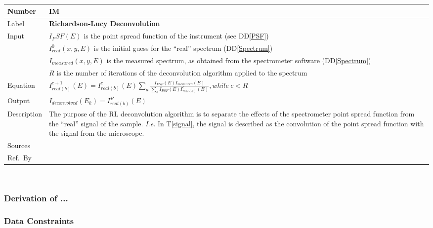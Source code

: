 \documentclass[12pt]{article}
\newcommand{\colAwidth}{0.13\textwidth}
\newcommand{\colBwidth}{0.82\textwidth}
\newcommand{\ddref}[1]{DD\ref{#1}}
\newcommand{\tref}[1]{T\ref{#1}}
\newcounter{instnum} %
\begin{document}
\noindent
\begin{minipage}{\textwidth}
	\renewcommand*{\arraystretch}{1.5}
	\begin{tabular}{| p{\colAwidth} | p{\colBwidth}|}
		\hline
		\rowcolor[gray]{0.9}
		Number& IM{instnum}\theinstnum \label{deconvolution}\\
		\hline
		Label& \bf Richardson-Lucy Deconvolution\\
		\hline
		Input& $I_PSF(E)$ is the point spread function of the instrument (see \ddref{PSF})\\
		& $I_{real}^0(x,y,E)$ is the initial guess for the ``real'' spectrum (\ddref{Spectrum})\\
		& $I_{measured}(x,y,E)$ is the measured spectrum, as obtained from the spectrometer software (\ddref{Spectrum})\\
		& $R$ is the number of iterations of the deconvolution algorithm applied to the spectrum \\
		\hline
		Equation & $I_{real (b)}^{c+1}(E)=I_{real (b)}^c(E)\sum_a{\frac{I_{PSF}(E)I_{measured}(E)}{\sum_d{I_{PSF}(E)I_{real (d)}^c(E)}}}, while\ c < R$\\
		\hline
		Output& $I_{deconvolved}(E_k)=I_{real (b)}^{R}(E)$\\
		\hline
		Description & The purpose of the RL deconvolution algorithm is to separate the effects of the spectrometer point spread function from the ``real'' signal of the sample. \textit{I.e.} In \tref{signal}, the signal is described as the convolution of the point spread function with the signal from the microscope.\\
		\hline
		Sources&~\cite{gloter_improving_2003, bellido_toward_2014} \ \\
		\hline
		Ref.\ By & \\
		\hline
	\end{tabular}
\end{minipage}\\


\subsubsection*{Derivation of ...}


\subsubsection{Data Constraints} \label{sec_DataConstraints}    
\end{document}
